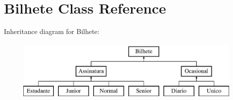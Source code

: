 \hypertarget{classBilhete}{}\section{Bilhete Class Reference}
\label{classBilhete}
Inheritance diagram for Bilhete\+:\begin{figure}[H]
\begin{center}
\leavevmode
\includegraphics[height=3.000000cm]{classBilhete}
\end{center}
\end{figure}

